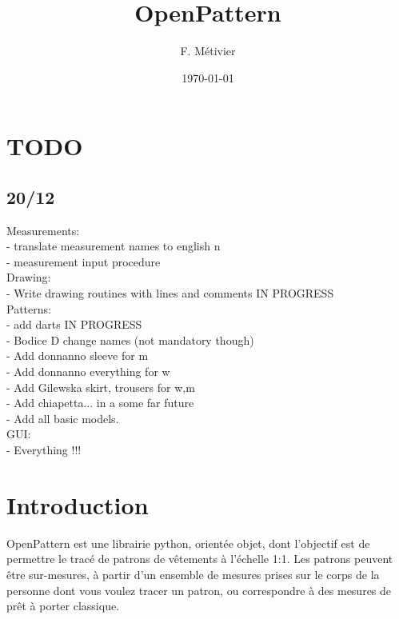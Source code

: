\documentclass[11pt,a4paper]{article}
\begin{document}
\title{OpenPattern}
\author{F. Métivier}
\date{\today}
\maketitle

\tableofcontents

\section{TODO}

\subsection{20/12}


Measurements:\\
- translate measurement names to english n\\
- measurement input procedure\\

Drawing:\\
- Write drawing routines with lines and comments IN PROGRESS\\


Patterns:\\
- add darts IN PROGRESS\\
- Bodice D change names (not mandatory though)\\
- Add donnanno sleeve for m\\
- Add donnanno everything for w\\
- Add Gilewska skirt, trousers for w,m\\
- Add chiapetta... in a some far future\\
- Add all basic models.\\

GUI:\\
- Everything !!!\\


\section{Introduction}

OpenPattern  est une librairie python, orientée objet,  dont l'objectif est de permettre le tracé de patrons de vêtements à l'échelle 1:1. 
Les patrons peuvent être sur-mesures, à  partir d'un ensemble de mesures prises sur le corps de la personne dont vous voulez tracer un patron, ou
correspondre à des mesures de prêt à porter classique. 
 
\end{document}
